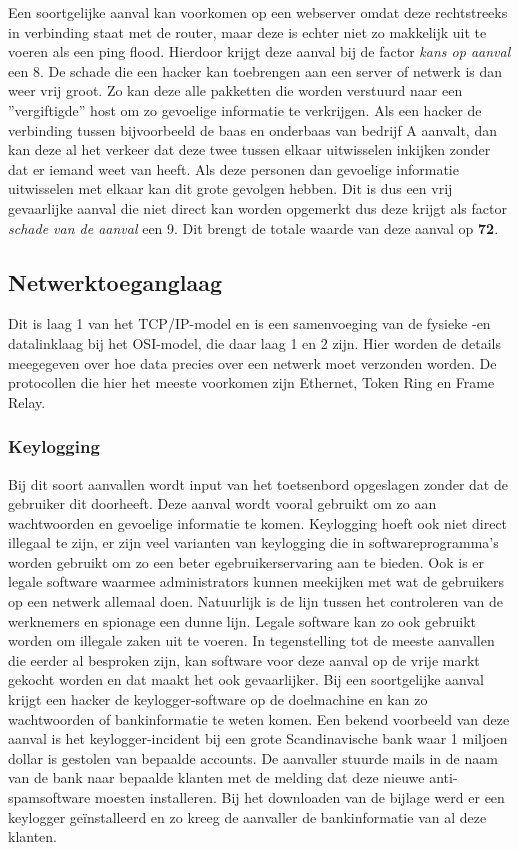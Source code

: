 \documentclass[pdftex,a4paper,12pt]{report}
\begin{document}
Een soortgelijke aanval kan voorkomen op een webserver omdat deze rechtstreeks in verbinding staat met de router, maar deze is echter niet zo makkelijk uit te voeren als een ping flood. Hierdoor krijgt deze aanval bij de factor \textit{kans op aanval} een 8. De schade die een hacker kan toebrengen aan een server of netwerk is dan weer vrij groot. Zo kan deze alle pakketten die worden verstuurd naar een ''vergiftigde'' host om zo gevoelige informatie te verkrijgen. Als een hacker de verbinding tussen bijvoorbeeld de baas en onderbaas van bedrijf A aanvalt, dan kan deze al het verkeer dat deze twee tussen elkaar uitwisselen inkijken zonder dat er iemand weet van heeft. Als deze personen dan gevoelige informatie uitwisselen met elkaar kan dit grote gevolgen hebben. Dit is dus een vrij gevaarlijke aanval die niet direct kan worden opgemerkt dus deze krijgt als factor \textit{schade van de aanval} een 9. Dit brengt de totale waarde van deze aanval op \textbf{72}.

\subsection{Netwerktoeganglaag}
Dit is laag 1 van het TCP/IP-model en is een samenvoeging van de fysieke -en datalinklaag bij het OSI-model, die daar laag 1 en 2 zijn. Hier worden de details meegegeven over hoe data precies over een netwerk moet verzonden worden. De protocollen die hier het meeste voorkomen zijn Ethernet, Token Ring en Frame Relay. 

\subsubsection{Keylogging}
Bij dit soort aanvallen wordt input van het toetsenbord opgeslagen zonder dat de gebruiker dit doorheeft. Deze aanval wordt vooral gebruikt om zo aan wachtwoorden en gevoelige informatie te komen. Keylogging hoeft ook niet direct illegaal te zijn, er zijn veel varianten van keylogging die in softwareprogramma's worden gebruikt om zo een beter egebruikerservaring aan te bieden. Ook is er legale software waarmee administrators kunnen meekijken met wat de gebruikers op een netwerk allemaal doen. Natuurlijk is de lijn tussen het controleren van de werknemers en spionage een dunne lijn. Legale software kan zo ook gebruikt worden om illegale zaken uit te voeren. In tegenstelling tot de meeste aanvallen die eerder al besproken zijn, kan software voor deze aanval op de vrije markt gekocht worden en dat maakt het ook gevaarlijker. Bij een soortgelijke aanval krijgt een hacker de keylogger-software op de doelmachine en kan zo wachtwoorden of bankinformatie te weten komen. Een bekend voorbeeld van deze aanval is het keylogger-incident bij een grote Scandinavische bank waar 1 miljoen dollar is gestolen van bepaalde accounts. De aanvaller stuurde mails in de naam van de bank naar bepaalde klanten met de melding dat deze nieuwe anti-spamsoftware moesten installeren. Bij het downloaden van de bijlage werd er een keylogger geïnstalleerd en zo kreeg de aanvaller de bankinformatie van al deze klanten. \citep{Grebennikov2007} \newline
 
\end{document}
